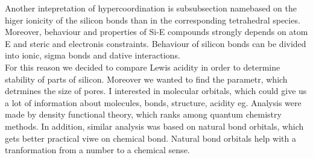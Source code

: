 \documentclass[
  digital, %
  table,   %
  lof,     %
  lot,     %
]{fithesis3}
\begin{document}
 Another intepretation of hypercoordination is subsubsection namebased on the higer ionicity of the silicon bonds than in the corresponding tetrahedral species. Moreover, behaviour and properties of Si-E compounds strongly depends on atom E and steric and electronis constraints. Behaviour of silicon bonds can be divided into ionic, sigma bonds and dative interactions. \cite{Wagler2014}\\
For this reason we decided to compare Lewis acidity in order to determine stability of parts of silicon. Moreover we wanted to find the parametr, which detrmines the size of pores. I interested in molecular orbitals, which could give us a lot of information about molecules, bonds, structure, acidity eg. Analysis were made by density functional theory, which ranks among quantum chemistry methods. In addition, similar analysis was based on natural bond orbitals, which gets better practical viwe on chemical bond. Natural bond orbitals help with a tranformation from a number to a chemical sense.
\end{document}
